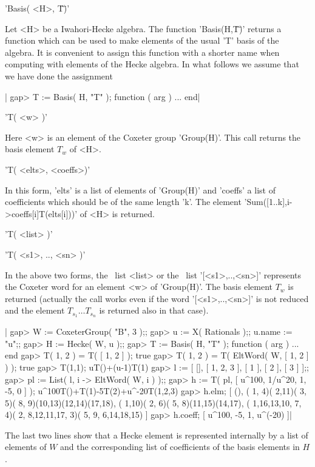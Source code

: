 
'Basis( <H>, \"T\" )'

Let  <H> be  a  Iwahori-Hecke  algebra.   The  function  'Basis(H,\"T\")'
returns a function which can  be used to make  elements of the usual  'T'
basis of the algebra.  It  is convenient to  assign this function with  a
shorter name when computing with elements of  the Hecke algebra.  In what
follows we assume that we have done the assignment\:\

|    gap> T := Basis( H, "T" );
    function ( arg ) ... end|

'T( <w> )'

Here  <w> is  an  element of  the Coxeter  group  'Group(H)'. This  call
returns the basis element $T_w$ of <H>.

'T( <elts>, <coeffs>)'

In this form, 'elts' is a list  of elements of 'Group(H)' and 'coeffs' a
list of coefficients which should be of the same length 'k'. The element
'Sum([1..k],i->coeffs[i]\*T(elts[i]))' of <H> is returned.

'T( <list> )'

'T( <s1>, .., <sn> )'

In  the  above two  forms,  the  \GAP\ list  <list>  or  the \GAP\  list
'[<s1>,..,<sn>]'  represents the  Coxeter  word for  an  element <w>  of
'Group(H)'. The basis element $T_w$ is returned (actually the call works
even  if  the word  '[<s1>,..,<sn>]'  is  not  reduced and  the  element
$T_{s_1}\ldots T_{s_n}$ is returned also in that case).

|    gap> W := CoxeterGroup( "B", 3 );;
    gap> u := X( Rationals );; u.name := "u";;
    gap> H := Hecke( W, u );;
    gap> T := Basis( H, "T" );
    function ( arg ) ... end
    gap> T( 1, 2 ) = T( [ 1, 2 ] );
    true
    gap> T( 1, 2 ) = T( EltWord( W, [ 1, 2 ] ) );
    true
    gap> T(1,1);
    uT()+(u-1)T(1)
    gap> l := [ [], [ 1, 2, 3 ], [ 1 ], [ 2 ], [ 3 ] ];;
    gap> pl := List( l, i -> EltWord( W, i ) );;
    gap> h := T( pl, [ u^100, 1/u^20, 1, -5, 0 ] );
    u^100T()+T(1)-5T(2)+u^-20T(1,2,3)
    gap> h.elm;
    [ (), ( 1, 4)( 2,11)( 3, 5)( 8, 9)(10,13)(12,14)(17,18),
      ( 1,10)( 2, 6)( 5, 8)(11,15)(14,17),
      ( 1,16,13,10, 7, 4)( 2, 8,12,11,17, 3)( 5, 9, 6,14,18,15) ]
    gap> h.coeff;
    [ u^100, -5, 1, u^(-20) ]|

The last two lines show that a Hecke element is represented internally by a
list  of elements of $W$ and the  corresponding list of coefficients of the
basis elements in $H$.

